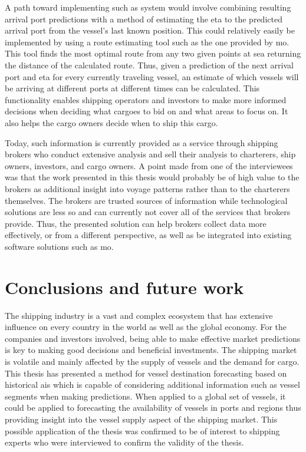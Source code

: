 A path toward implementing such as system would involve combining resulting arrival port predictions with a method of estimating the \acrfull{eta} to the predicted arrival port from the vessel's last known position. This could relatively easily be implemented by using a route estimating tool such as the one provided by \acrshort{mo}. This tool finds the most optimal route from any two given points at sea returning the distance of the calculated route. Thus, given a prediction of the next arrival port and \acrshort{eta} for every currently traveling vessel, an estimate of which vessels will be arriving at different ports at different times can be calculated. This functionality enables shipping operators and investors to make more informed decisions when deciding what cargoes to bid on and what areas to focus on. It also helps the cargo owners decide when to ship this cargo.

Today, such information is currently provided as a service through shipping brokers who conduct extensive analysis and sell their analysis to charterers, ship owners, investors, and cargo owners. A point made from one of the interviewees was that the work presented in this thesis would probably be of high value to the brokers as additional insight into voyage patterns rather than to the charterers themselves. The brokers are trusted sources of information while technological solutions are less so and can currently not cover all of the services that brokers provide. Thus, the presented solution can help brokers collect data more effectively, or from a different perspective, as well as be integrated into existing software solutions such as \acrshort{mo}.

\section{Conclusions and future work}

The shipping industry is a vast and complex ecosystem that has extensive influence on every country in the world as well as the global economy. For the companies and investors involved, being able to make effective market predictions is key to making good decisions and beneficial investments. The shipping market is volatile and mainly affected by the supply of vessels and the demand for cargo. This thesis has presented a method for vessel destination forecasting based on historical \acrshort{ais} which is capable of considering additional information such as vessel segments when making predictions. When applied to a global set of vessels, it could be applied to forecasting the availability of vessels in ports and regions thus providing insight into the vessel supply aspect of the shipping market. This possible application of the thesis was confirmed to be of interest to shipping experts who were interviewed to confirm the validity of the thesis.

